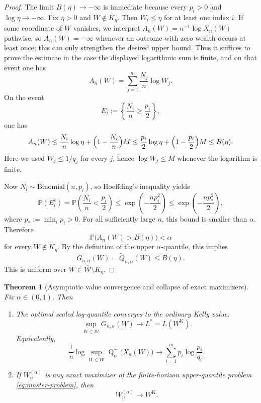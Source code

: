 \documentclass[11pt]{article}
\newtheorem{theorem}{Theorem}[section]
\theoremstyle{definition}
\newcommand{\Prob}{\mathbb{P}}
\newcommand{\1}{\mathbf{1}}
\newcommand{\Quant}{\operatorname{Q}}
\begin{document}
\begin{proof}
The limit $B(\eta)\to -\infty$ is immediate because every $p_i>0$ and $\log \eta\to -\infty$. Fix $\eta>0$ and $W\notin K_\eta$. Then $W_i\le \eta$ for at least one index $i$. If some coordinate of $W$ vanishes, we interpret $A_n(W)=n^{-1}\log X_n(W)$ pathwise, so $A_n(W)=-\infty$ whenever an outcome with zero wealth occurs at least once; this can only strengthen the desired upper bound. Thus it suffices to prove the estimate in the case the displayed logarithmic sum is finite, and on that event one has
\[
A_n(W)=\sum_{j=1}^m \frac{N_j}{n}\log W_j.
\]
On the event
\[
E_i:=\left\{\frac{N_i}{n}\ge \frac{p_i}{2}\right\},
\]
one has
\[
A_n(W)
\le \frac{N_i}{n}\log \eta+\Bigl(1-\frac{N_i}{n}\Bigr)M
\le \frac{p_i}{2}\log \eta+\Bigl(1-\frac{p_i}{2}\Bigr)M
\le B(\eta).
\]
Here we used $W_j\le 1/q_j$ for every $j$, hence $\log W_j\le M$ whenever the logarithm is finite.

Now $N_i\sim \mathrm{Binomial}(n,p_i)$, so Hoeffding's inequality yields
\[
\Prob(E_i^c)
=\Prob\!\left(\frac{N_i}{n}<\frac{p_i}{2}\right)
\le \exp\!\left(-\frac{n p_i^2}{2}\right)
\le \exp\!\left(-\frac{n p_*^2}{2}\right),
\]
where $p_*:=\min_i p_i>0$. For all sufficiently large $n$, this bound is smaller than $\alpha$. Therefore
\[
\Prob\bigl(A_n(W)>B(\eta)\bigr)<\alpha
\]
for every $W\notin K_\eta$. By the definition of the upper $\alpha$-quantile, this implies
\[
G_{n,\alpha}(W)=\widetilde Q_{n,\alpha}(W)\le B(\eta).
\]
This is uniform over $W\in \overline{\mathcal W}\setminus K_\eta$.
\end{proof}

\begin{theorem}[Asymptotic value convergence and collapse of exact maximizers]
\label{thm:asymptotic-collapse}
Fix $\alpha\in(0,1)$. Then
\begin{enumerate}[label=(\alph*), itemsep=4pt]
  \item The optimal scaled log-quantile converges to the ordinary Kelly value:
  \[
  \sup_{W\in\overline{\mathcal W}} G_{n,\alpha}(W)\to L^*=L(W^{\mathrm K}).
  \]
  Equivalently,
  \[
  \frac1n \log \sup_{W\in\overline{\mathcal W}} \Quant_\alpha^+\bigl(X_n(W)\bigr)
  \to \sum_{i=1}^m p_i \log \frac{p_i}{q_i}.
  \]
  \item If $W_n^{(\alpha)}$ is any exact maximizer of the finite-horizon upper-quantile problem \eqref{eq:master-problem}, then
  \[
  W_n^{(\alpha)}\to W^{\mathrm K}.
  \]
\end{enumerate}
\end{theorem}
\end{document}
